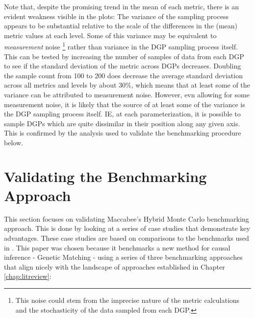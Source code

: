 \documentclass[../main.tex]{subfiles}
\begin{document}
Note that, despite the promising trend in the mean of each metric, there is an evident weakness visible in the plots: The variance of the sampling process appears to be substantial relative to the scale of the differences in the (mean) metric values at each level. Some of this variance may be equivalent to \textit{measurement} noise \footnote{This noise could stem from the imprecise nature of the metric calculations and the stochasticity of the data sampled from each DGP.} rather than variance in the DGP sampling process itself. This can be tested by increasing the number of samples of data from each DGP to see if the standard deviation of the metric across DGPs decreases. Doubling the sample count from 100 to 200 does decrease the average standard deviation across all metrics and levels by about 30\%, which means that at least some of the variance can be attributed to measurement noise. However, evn allowing for some measurement noise, it is likely that the source of at least some of the variance is the DGP sampling process itself. IE, at each parameterization, it is possible to sample DGPs which are quite dissimilar in their position along any given axis. This is confirmed by the analysis used to validate the benchmarking procedure below.

\section{Validating the Benchmarking Approach}

This section focuses on validating Maccabee's Hybrid Monte Carlo benchmarking approach. This is done by looking at a series of case studies that demonstrate key advantages. These case studies are based on comparisons to the benchmarks used in \textcite{Diamond2013GeneticStudies}. This paper was chosen because it benchmarks a new method for causal inference - Genetic Matching - using a series of three benchmarking approaches that align nicely with the landscape of approaches established in Chapter \ref{chap:litreview}:
\end{document}
